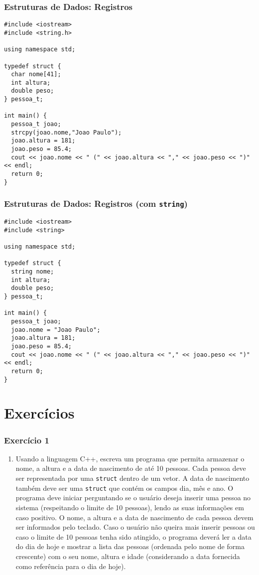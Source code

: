 \documentclass[aspectratio=169]{beamer}
\newcommand\setItemnumber[1]{\setcounter{enumi}{\numexpr#1-1\relax}}
\begin{document}
\begin{frame}[fragile]\frametitle{Estruturas de Dados: Registros}
\begin{lstlisting}[basicstyle=\ttfamily\scriptsize]
#include <iostream>
#include <string.h>

using namespace std;

typedef struct {
  char nome[41];
  int altura;
  double peso;
} pessoa_t;

int main() {
  pessoa_t joao;
  strcpy(joao.nome,"Joao Paulo");
  joao.altura = 181;
  joao.peso = 85.4;
  cout << joao.nome << " (" << joao.altura << "," << joao.peso << ")" << endl;
  return 0;
}
\end{lstlisting}
\end{frame}

\begin{frame}[fragile]\frametitle{Estruturas de Dados: Registros (com \texttt{string})}
\begin{lstlisting}[basicstyle=\ttfamily\scriptsize]
#include <iostream>
#include <string>

using namespace std;

typedef struct {
  string nome;
  int altura;
  double peso;
} pessoa_t;

int main() {
  pessoa_t joao;
  joao.nome = "Joao Paulo";
  joao.altura = 181;
  joao.peso = 85.4;
  cout << joao.nome << " (" << joao.altura << "," << joao.peso << ")" << endl;
  return 0;
}
\end{lstlisting}
\end{frame}

\section{Exercícios}

\begin{frame}\frametitle{Exercício 1}
\begin{enumerate}
	\setItemnumber{1}
	\item Usando a linguagem C++, escreva um programa que permita armazenar o nome, a altura e a data de nascimento de até 10 pessoas. Cada pessoa deve ser representada por uma \texttt{struct} dentro de um vetor. A data de nascimento também deve ser uma \texttt{struct} que contém os campos dia, mês e ano. O programa deve iniciar perguntando se o usuário deseja inserir uma pessoa no sistema (respeitando o limite de 10 pessoas), lendo as suas informações em caso positivo. O nome, a altura e a data de nascimento de cada pessoa devem ser informados pelo teclado. Caso o usuário não queira mais inserir pessoas ou caso o limite de 10 pessoas tenha sido atingido, o programa deverá ler a data do dia de hoje e mostrar a lista das pessoas (ordenada pelo nome de forma crescente) com o seu nome, altura e idade (considerando a data fornecida como referência para o dia de hoje).
\end{enumerate}
\end{frame}
\end{document}
